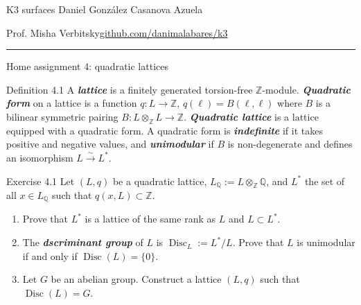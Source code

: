 
\usepackage[style=authortitle-terse,backend=bibtex]{biblatex}


\setcounter{secnumdepth}{0}



\begin{minipage}{\textwidth}
	\begin{minipage}{1\textwidth}
		K3 surfaces \hfill Daniel González Casanova Azuela
		
		{\small Prof. Misha Verbitsky\hfill\href{https://github.com/danimalabares/k3}{github.com/danimalabares/k3}}
	\end{minipage}
\end{minipage}\vspace{.2cm}\hrule

\vspace{10pt}
{\huge Home assignment 4: quadratic lattices}

\begin{idea5}{Definition 4.1}\leavevmode
	A \textit{\textbf{lattice}} is a finitely generated torsion-free $\mathbb{Z}$-module. \textit{\textbf{Quadratic form}} on a lattice is a function $q:L\to \mathbb{Z}$, $q(\ell)=B(\ell,\ell)$ where $B$ is a bilinear symmetric pairing $B:L\otimes_\mathbb{Z}L\longrightarrow \mathbb{Z}$. \textit{\textbf{Quadratic lattice}} is a lattice equipped with a quadratic form. A quadratic form is \textit{\textbf{indefinite}} if it takes positive and negative values, and \textit{\textbf{unimodular}} if $B$ is non-degenerate and defines an isomorphism $L\xrightarrow{\sim}L^*$.
\end{idea5}

\begin{idea4}{Exercise 4.1}\leavevmode
	Let $(L,q)$ be a quadratic lattice, $L_{\mathbb{Q}}:=L\otimes_{\mathbb{Z}}\mathbb{Q}$, and $L^*$ the set of all $x\in L_{\mathbb{Q}}$ such that $q(x,L)\subset \mathbb{Z}$.
	\begin{enumerate}[label=\alph*.]
		\item Prove that $L^*$ is a lattice of the same rank as $L$ and $L\subset L^*$.
		\item The \textit{\textbf{dscriminant group}} of $L$ is $\operatorname{Disc}_L:=L^*/L$. Prove that $L$ is unimodular if and only if $\operatorname{Disc}(L)=\{0\}$.
		\item Let $G$ be an abelian group. Construct a lattice $(L,q)$ such that $\operatorname{Disc}(L)=G$.
	\end{enumerate}
\end{idea4}

